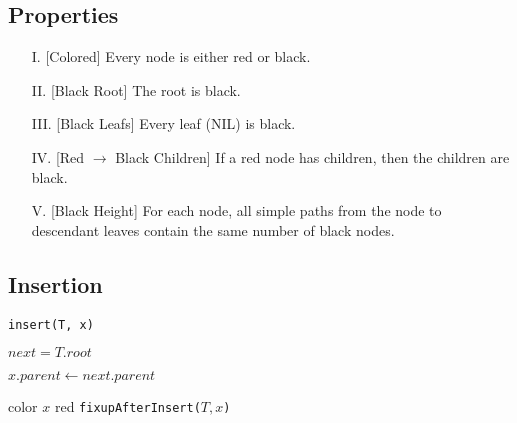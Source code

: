 \documentclass{summary}
\begin{document}
\subsection{Properties}
\begin{itemize}
  \item[I.]\label{properties:1} [Colored] Every node is either red or black.
  \item[II.]\label{properties:2} [Black Root] The root is black.
  \item[III.]\label{properties:3} [Black Leafs] Every leaf (NIL) is black.
  \item[IV.]\label{properties:4} [Red $\to$ Black Children] If a red node has children, then the children are black.
  \item[V.]\label{properties:5} [Black Height] For each node, all simple paths from the node to descendant leaves contain the same number of black nodes.
\end{itemize}

\subsection{Insertion}

\begin{algorithm}[H]
  \caption{\texttt{insert(T, x)}}

  \BlankLine

  $next = T.root$\;

  $x.parent \gets next.parent$\;

  color $x$ red\;
  \texttt{fixupAfterInsert($T, x$)}\;
\end{algorithm}
\end{document}
